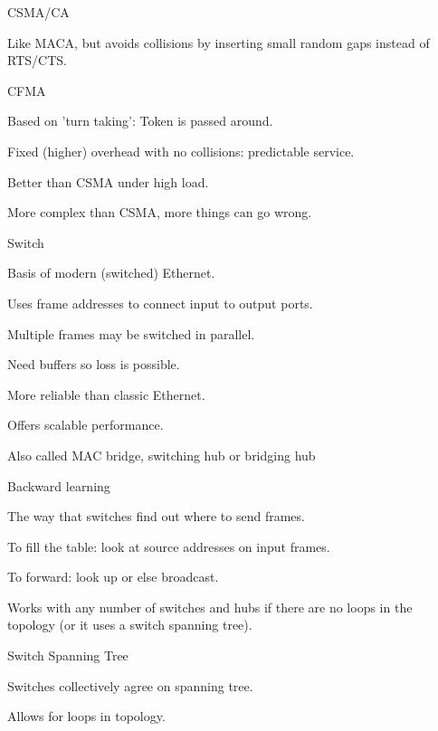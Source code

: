 \documentclass[main.tex]{subfiles}
\begin{document}
\begin{card}{CSMA/CA}
\item Like MACA, but avoids collisions by inserting small random gaps instead of RTS/CTS.
\end{card}

\begin{card}{CFMA}
\item Based on 'turn taking': Token is passed around.
\item Fixed (higher) overhead with no collisions: predictable service.
\item Better than CSMA under high load.
\item More complex than CSMA, more things can go wrong.
\end{card}

\begin{card}{Switch}
\item Basis of modern (switched) Ethernet.
\item Uses frame addresses to connect input to output ports.
\item Multiple frames may be switched in parallel.
\item Need buffers so loss is possible.
\item More reliable than classic Ethernet.
\item Offers scalable performance.
\item Also called MAC bridge, switching hub or bridging hub
\end{card}

\begin{card}{Backward learning}
\item The way that switches find out where to send frames.
\item To fill the table: look at source addresses on input frames.
\item To forward: look up or else broadcast.
\item Works with any number of switches and hubs if there are no loops in the topology (or it uses a switch spanning tree).
\end{card}

\begin{card}{Switch Spanning Tree}
\item Switches collectively agree on spanning tree.
\item Allows for loops in topology.
\end{card}
\end{document}
